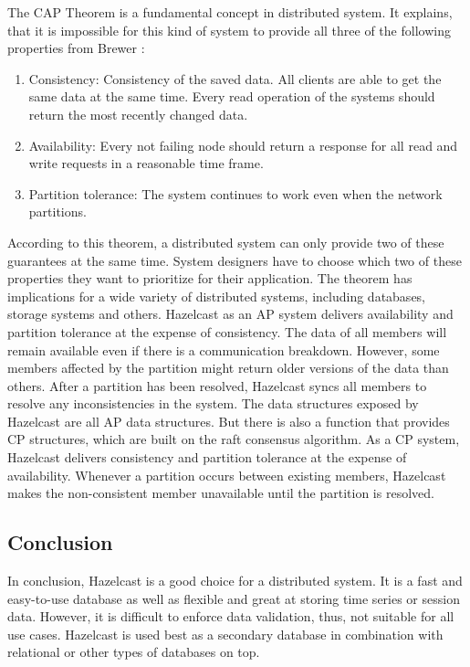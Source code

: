 The CAP Theorem is a fundamental concept in distributed system. It explains, that it is impossible for 
this kind of system to provide all three of the following properties from Brewer \parencite[S.~23]{Brewer.2012}:
\begin{enumerate}
    \item Consistency: Consistency of the saved data. All clients are able to get the same data at the same time. Every read operation of the systems should return the most recently changed data.
    \item Availability: Every not failing node should return a response for all read and write requests in a reasonable time frame.
    \item Partition tolerance: The system continues to work even when the network partitions.
\end{enumerate}

\noindent
According to this theorem, a distributed system can only provide two of these guarantees at the same 
time. System designers have to choose which two of these properties they want to prioritize for their 
application. The theorem has implications for a wide variety of distributed systems, including databases, 
storage systems and others. \parencite[S.~1]{Brewer.2017}
Hazelcast as an AP system delivers availability and partition tolerance at the expense of consistency. 
The data of all members will remain available even if there is a communication breakdown. 
However, some members affected by the partition might return older versions of the data than others. 
After a partition has been resolved, Hazelcast syncs all members to resolve any inconsistencies in the 
system. The data structures exposed by Hazelcast are all AP data structures. 
But there is also a function  that provides CP structures, which are built on the raft consensus algorithm. 
As a CP system, Hazelcast  delivers consistency and partition tolerance at the expense of availability. 
Whenever a partition occurs between existing members, Hazelcast makes the non-consistent member 
unavailable until the partition is resolved. \parencite{Hazelcast.05.04.2023}

\subsection{Conclusion} \label{subsec:conclusionHazelcast}

In conclusion, Hazelcast is a good choice for a distributed system. It is a fast and easy-to-use database as well as
flexible and great at storing time series or session data. However, it is difficult to enforce data validation, thus, 
not suitable for all use cases. Hazelcast is used best as a secondary database in combination with relational or other types of databases on top.

